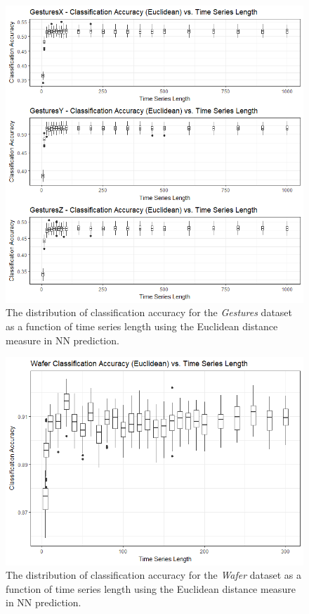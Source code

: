 \documentclass[10pt,a4paper]{article}
\begin{document}
\begin{figure}[H]
\begin{center}
	\includegraphics[width=1\textwidth]{Images/GesturesAccuracyVsLengthEUCLIDEAN_box.png}
	\caption{The distribution of classification accuracy for the \textit{Gestures} dataset as a function of time series length using the Euclidean distance measure in NN prediction.}
\end{center}
\end{figure}

\begin{figure}[H]
\begin{center}
	\includegraphics[width=1\textwidth]{Images/WaferAccuracyVsLengthEUCLIDEAN_box.png}
	\caption{The distribution of classification accuracy for the \textit{Wafer} dataset as a function of time series length using the Euclidean distance measure in NN prediction.}
\end{center}
\end{figure}
\end{document}
